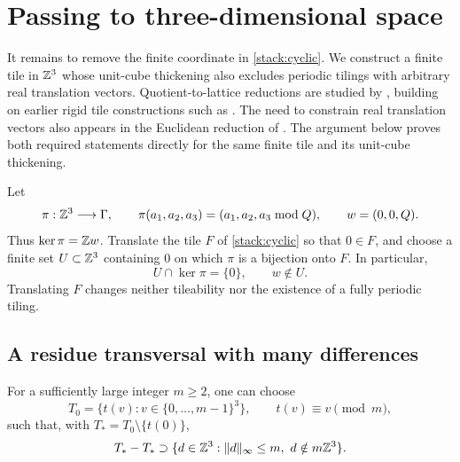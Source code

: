 \section{Passing to three-dimensional space}
\label{sec:geometry}

It remains to remove the finite coordinate in \cref{stack:cyclic}.
We construct a finite tile in $\mathbb Z^3$ whose unit-cube thickening also
excludes periodic tilings with arbitrary real translation vectors.
Quotient-to-lattice reductions are studied by \citet[Theorem~1.1]{MSSReduction},
building on earlier rigid tile constructions such as
\citet[Lemma~9.3]{GTTwoTiles}. The need to constrain real translation
vectors also appears in the Euclidean reduction of
\citet[Theorem~2.1 and Lemma~2.2]{GTPeriodic}. The argument below
proves both required statements directly for the same finite tile
and its unit-cube thickening.

Let
\[
 \pi:\mathbb Z^3\longrightarrow\Gamma,\qquad
 \pi(a_1,a_2,a_3)=(a_1,a_2,a_3\bmod Q),
 \qquad w=(0,0,Q).
\]
Thus $\ker\pi=\mathbb Z w$.  Translate the tile $F$ of \cref{stack:cyclic}
so that $0\in F$, and choose a finite set $U\subset\mathbb Z^3$ containing
$0$ on which $\pi$ is a bijection onto $F$.  In particular,
\begin{equation}
 U\cap\ker\pi=\{0\},\qquad w\notin U.
 \label{geom:representatives-U}
\end{equation}
Translating $F$ changes neither tileability nor the existence of a
fully periodic tiling.

\subsection{A residue transversal with many differences}

\begin{lemma}
\label{geom:random-representatives}
For a sufficiently large integer $m\geq2$, one can choose
\[
 T_0=\{t(v):v\in\{0,\ldots,m-1\}^3\},\qquad
 t(v)\equiv v\pmod m,
\]
such that, with $T_*=T_0\setminus\{t(0)\}$,
\begin{equation}
 T_*-T_*\supset
 \{d\in\mathbb Z^3:\lVert d\rVert_\infty\leq m,
                         \ d\notin m\mathbb Z^3\}.
 \label{geom:difference-property}
\end{equation}
\end{lemma}

